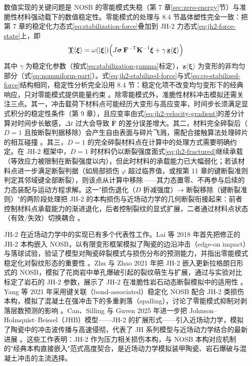 数值实现的关键问题是 NOSB 的零能模式失稳（第 7 章\ref{sec:zero-energy}节）与准脆性材料强动载下的数值稳定性。零能模式的处理与 8.4 节晶体塑性完全一致：把第 7 章的稳定化力态式\eqref{eq:stabilization-force}叠加到 JH-2 力态式\eqref{eq:jh2-force-state}上，即
\begin{equation}
  \underline{\mathbf{T}}\langle\boldsymbol{\xi}\rangle
  =\omega(|\boldsymbol{\xi}|)\Bigl(J\boldsymbol{\sigma}\,\mathbf{F}^{-\mathrm{T}}\mathbf{K}^{-1}\boldsymbol{\xi}
  +\gamma\,\underline{\mathbf{z}}\langle\boldsymbol{\xi}\rangle\Bigr)
  \label{eq:jh2-stabilized-force}
\end{equation}
其中 $\gamma$ 为稳定化参数（按式\eqref{eq:stabilization-gamma}标定），$\underline{\mathbf{z}}\langle\boldsymbol{\xi}\rangle$ 为变形的非均匀部分（式\eqref{eq:nonuniform-part}）。式\eqref{eq:jh2-stabilized-force}与式\eqref{eq:cp-stabilized-force}结构相同，稳定性分析完全沿用 8.4 节：稳定化项不改变均匀变形下的经典响应，只对零能模式提供能量约束 \cite{Silling2017,GuZhangMadenciXia2019}。除零能模式外，准脆性材料冲击模拟还需关注三点。其一，冲击载荷下材料点可能经历大变形与高应变率，时间步长须满足显式积分的稳定性条件（第 9 章），且应变率由式\eqref{eq:jh2-velocity-gradient}的差分计算对时间步长敏感，$\Delta t$ 过大会导致 $\dot{\mathbf{F}}$ 的差分误差增大。其二，材料完全碎裂后（$D=1$ 且按断裂判据移除）会产生自由表面与碎片飞溅，需配合接触算法处理碎片的相互碰撞 \cite{Lai2018,ZhuZhao2021}。其三，$D=1$ 的完全碎裂材料点在计算中的处理方式需要明确约定。在 JH-2 框架中，$D=1$ 时材料仍以断裂强度面式\eqref{eq:jh2-fractured}继续承载（等效应力被限制在断裂强度以内），但此时材料的承载能力已大幅弱化；若该材料点进一步满足断裂判据（如局部损伤 $\varphi$ 超过临界值，或按第 11 章的键断裂准则判定其邻域键全部断裂），则该点从计算中移除——其力态置零、不再参与后续的力态装配与运动方程求解。这一"损伤退化（$D$ 折减强度）→ 断裂移除（键断裂准则）"的两阶段处理把 JH-2 的本构损伤与近场动力学的几何断裂衔接起来：前者控制材料点承载能力的渐进退化，后者控制裂纹的显式扩展，二者通过材料点状态（有效/失效）切换耦合 \cite{Lai2018,YangGuZhangXia2021}。

JH-2 在近场动力学中的实现已有多个代表性工作。Lai 等 2018 年首先把修正的 JH-2 本构嵌入 NOSB，以有限变形框架模拟了陶瓷的边沿冲击（edge-on impact）与落球试验，验证了模型对陶瓷碎裂模式与损伤分布的预测能力，并指出零能模式稳定化对裂纹形态的重要性 \cite{Lai2018}。Zhu 与 Zhao 2021 年把 JH-2 嵌入更新拉格朗日形式的 NOSB，模拟了花岗岩中单孔爆破引起的裂纹萌生与扩展，通过与实验对比标定了岩石的 JH-2 参数，展示了 JH-2 在准脆性岩石动态断裂模拟中的适用性 \cite{ZhuZhao2021}。Yang 等 2021 年采用键关联（bond-associated）稳定化 NOSB 配合 JH-2 类损伤本构，模拟了混凝土在强冲击下的多重剥落（spalling），讨论了零能模式抑制对剥落层数预测的影响 \cite{YangGuZhangXia2021}。Can、Silling 与 Guven 2025 年进一步把 Johnson--Holmquist--Beissel（JHB）模型——JH-2 的扩展形式——引入近场动力学，模拟了陶瓷中的冲击波传播与高速侵彻，代表了 JH 系列模型与近场动力学结合的最新进展 \cite{CanSillingGuven2025}。这些工作表明：JH-2 作为压力相关损伤本构，与 NOSB 本构对应机制的"经典本构直接嵌入"范式高度契合，是近场动力学模拟装甲陶瓷、岩石爆破与混凝土冲击的主流选择。

